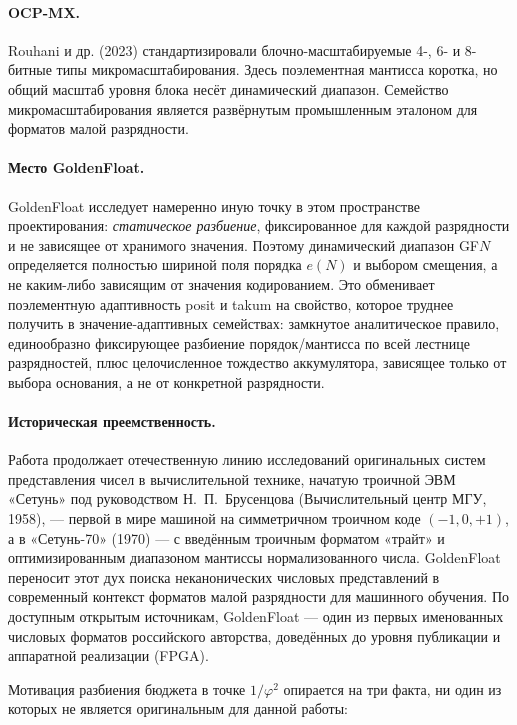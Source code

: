 \documentclass[11pt,a4paper]{article}
\theoremstyle{plain}
\begin{document}
\paragraph{OCP-MX.}
Rouhani и др. (2023) стандартизировали блочно-масштабируемые 4-, 6- и 8-битные
типы микромасштабирования. Здесь поэлементная мантисса коротка, но общий
масштаб уровня блока несёт динамический диапазон. Семейство микромасштабирования
является развёрнутым промышленным эталоном для форматов малой разрядности.

\paragraph{Место GoldenFloat.}
GoldenFloat исследует намеренно иную точку в этом пространстве проектирования:
\emph{статическое разбиение}, фиксированное для каждой разрядности и не
зависящее от хранимого значения. Поэтому динамический диапазон GF\(N\)
определяется полностью шириной поля порядка \(e(N)\) и выбором смещения, а не
каким-либо зависящим от значения кодированием.
Это обменивает поэлементную адаптивность posit и takum на свойство, которое
труднее получить в значение-адаптивных семействах: замкнутое аналитическое
правило, единообразно фиксирующее разбиение порядок/мантисса по всей лестнице
разрядностей, плюс целочисленное тождество аккумулятора, зависящее только от
выбора основания, а не от конкретной разрядности.

\paragraph{Историческая преемственность.}
Работа продолжает отечественную линию исследований оригинальных систем
представления чисел в вычислительной технике, начатую троичной ЭВМ
«Сетунь» под руководством Н.~П.~Брусенцова (Вычислительный центр МГУ,
1958), --- первой в мире машиной на симметричном троичном коде
\((-1, 0, +1)\), а в «Сетунь-70» (1970) --- с введённым троичным форматом
«трайт» и оптимизированным диапазоном мантиссы нормализованного числа.
GoldenFloat переносит этот дух поиска неканонических числовых
представлений в современный контекст форматов малой разрядности для
машинного обучения. По доступным открытым источникам, GoldenFloat --- один
из первых именованных числовых форматов российского авторства, доведённых
до уровня публикации и аппаратной реализации (FPGA).

Мотивация разбиения бюджета в точке \(1/\varphi^{2}\) опирается на три факта,
ни один из которых не является оригинальным для данной работы:
\end{document}
